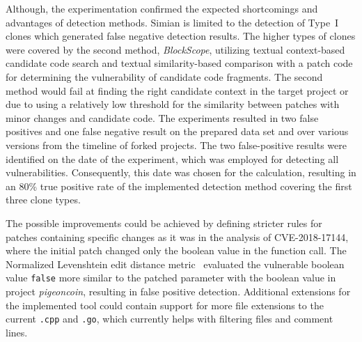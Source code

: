 Although, the experimentation confirmed the expected shortcomings and advantages of detection methods. Simian is limited to
the detection of Type~I clones which generated false negative detection results. The higher types of clones were covered
by the second method, \emph{BlockScope}, utilizing textual context-based candidate code search and textual similarity-based comparison with a patch
code for determining the vulnerability of candidate code fragments. The second method would fail at finding the right candidate
context in the target project or due to using a relatively low threshold for the similarity between patches with minor changes
and candidate code. The experiments resulted in two false positives and one false negative result on the prepared data set
and over various versions from the timeline of forked projects. The two false-positive results were identified on the date
of the experiment, which was employed for detecting all vulnerabilities. Consequently, this date was chosen for the
calculation, resulting in an 80\% true positive rate of the implemented detection method covering the first three clone types.

The possible improvements could be achieved by defining stricter rules for patches containing specific changes as it
was in the analysis of CVE-2018-17144, where the initial patch changed only the boolean value in the function call.
The Normalized Levenshtein edit distance metric~\cite{strsim} evaluated the vulnerable boolean value \texttt{false} more
similar to the patched parameter with the boolean value in project \emph{pigeoncoin}, resulting in false positive detection.
Additional extensions for the implemented tool could contain support for more file extensions to the current \texttt{.cpp}
and \texttt{.go}, which currently helps with filtering files and comment lines.

